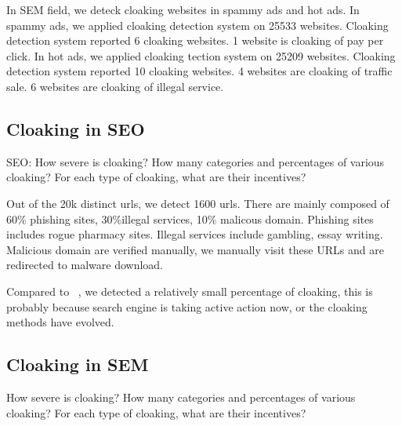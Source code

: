 In SEM field, we deteck cloaking websites in spammy ads and hot ads. In spammy ads,
we applied cloaking detection system on 25533 websites. Cloaking detection system reported 6 cloaking websites.
1 website is cloaking of pay per click. In hot ads, we applied cloaking tection system on 25209 websites.
Cloaking detection system reported 10 cloaking websites. 4 websites are cloaking of traffic sale.
6 websites are cloaking of illegal service. 



\subsection{Cloaking in SEO}

SEO: How severe is cloaking? How many categories and percentages of various
cloaking? For each type of cloaking, what are their incentives?

Out of the 20k distinct urls, we detect 1600 urls. There are mainly composed of
60\% phishing sites, 30\%illegal services, 10\% malicous domain. Phishing sites includes rogue
pharmacy sites. Illegal services include gambling, essay writing. Malicious
domain are verified manually, we manually visit these URLs and are redirected to
malware download.

Compared to  ~\cite{wang2011cloak}, we detected a relatively small percentage of
cloaking, this is probably because search engine is taking active action now, or
the cloaking methods have evolved.

%
%
%






\subsection{Cloaking in SEM}

How severe is cloaking? How many categories and percentages of various cloaking?
For each type of cloaking, what are their incentives?

